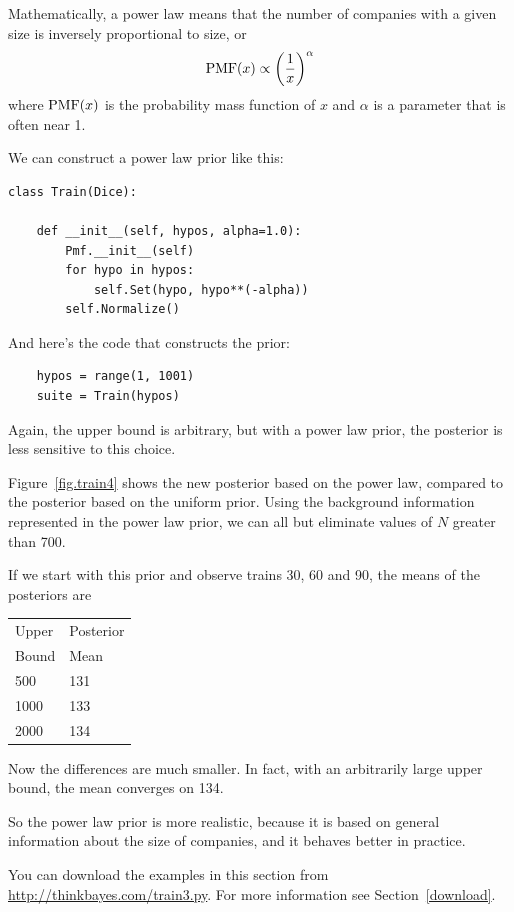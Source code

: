 \documentclass[12pt]{book}
\begin{document}
Mathematically, a power law means that the number of companies
with a given size is inversely proportional to size, or
%
\[ \mathrm{PMF}(x) \propto \left( \frac{1}{x} \right)^{\alpha}   \]
%
where $\mathrm{PMF}(x)$ is the probability mass function of $x$ and $\alpha$ is
a parameter that is often near 1.

We can construct a power law prior like this:

\begin{verbatim}
class Train(Dice):

    def __init__(self, hypos, alpha=1.0):
        Pmf.__init__(self)
        for hypo in hypos:
            self.Set(hypo, hypo**(-alpha))
        self.Normalize()
\end{verbatim}

And here's the code that constructs the prior:

\begin{verbatim}
    hypos = range(1, 1001)
    suite = Train(hypos)
\end{verbatim}

Again, the upper bound is arbitrary, but with a power law
prior, the posterior is less sensitive to this choice.

Figure~\ref{fig.train4} shows the new posterior based on
the power law, compared to the posterior based on the
uniform prior.  Using the background information
represented in the power law prior, we can all but eliminate
values of $N$ greater than 700.

If we start with this prior and observe trains 30, 60 and 90,
the means of the posteriors are

  \begin{tabular}{|l|l|}
  \hline
  Upper & Posterior \\
  Bound & Mean \\
  \hline
  500 & 131 \\
  1000 & 133 \\
  2000 & 134 \\
  \hline
  \end{tabular}

Now the differences are much smaller.  In fact,
with an arbitrarily large upper bound, the mean converges on 134.

So the power law prior is more realistic, because it is based on
general information about the size of companies, and it
behaves better in practice.

You can download the examples in this section from
\url{http://thinkbayes.com/train3.py}.
  For more information
see Section~\ref{download}.
\end{document}
